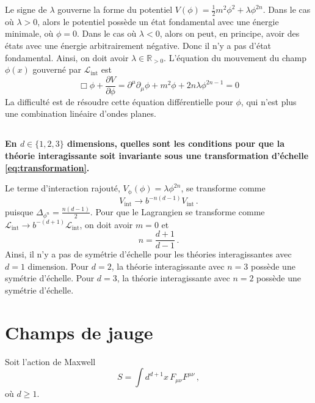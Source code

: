 \documentclass{article}
\numberwithin{equation}{section}
\theoremstyle{solution}
\begin{document}
Le signe de $\lambda $ gouverne la forme du potentiel $V(\phi) = \frac{1}{2}m^{2}\phi^{2} + \lambda \phi^{2n}$. 
Dans le cas où $\lambda > 0$, alors le potentiel possède un état fondamental avec une énergie minimale, où $\phi = 0$. 
Dans le cas où $\lambda < 0$, alors on peut, en principe, avoir des états avec une énergie arbitrairement négative.
Donc il n'y a pas d'état fondamental. Ainsi, on doit avoir $\lambda \in \mathbb{R}_{>0}$.
L'équation du mouvement du champ $\phi(x)$ gouverné par $\mathcal{L}_{\mathrm{int}}$ est
\begin{equation}
        \boxed{\Box\phi + \frac{\partial V}{\partial \phi} = \partial^\mu \partial_{\mu} \phi + m^2\phi + 2n\lambda \phi^{2n-1} = 0}
\end{equation} 
La difficulté est de résoudre cette équation différentielle pour $\phi$, qui n'est plus une combination linéaire d'ondes planes. 

\subsection{}
\textbf{En $d \in \{1,2,3\}$ dimensions, quelles sont les conditions pour que la théorie interagissante soit invariante
sous une transformation d’échelle \eqref{eq:transformation}.}
\vspace{2ex}

Le terme d'interaction rajouté, $V_{\mathrm{\phi}}(\phi) = \lambda \phi^{2n}$, se transforme comme
\begin{equation}
        V_{\mathrm{int}} \rightarrow b^{-n(d-1)}V_{\mathrm{int}}\, .
\end{equation} 
puisque $\Delta_{\phi^{n}} = \frac{n(d-1)}{2}$.
Pour que le Lagrangien se transforme comme $\mathcal{L}_{\mathrm{int}} \rightarrow b^{-(d+1)}\mathcal{L}_{\mathrm{int}}$, on doit avoir $m=0$ et 
\begin{equation}
        \boxed{n = \frac{d+1}{d-1}}\, .
\end{equation} 
Ainsi, il n'y a pas de symétrie d'échelle pour les théories interagissantes avec $d=1$ dimension. 
Pour $d=2$, la théorie interagissante avec $n=3$ possède une symétrie d'échelle. Pour $d=3$, la théorie interagissante 
avec $n=2$ possède une symétrie d'échelle.

\section{Champs de jauge}
Soit l'action de Maxwell
\begin{equation}\label{eq:MaxwellAction}
       S = \int d^{d+1}x\, F_{\mu\nu}F^{\mu\nu}\, ,
\end{equation} 
où $d \geq 1$.
\end{document}
